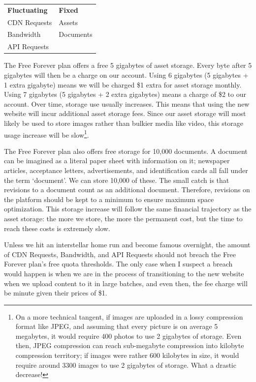 \begin{table}[H]
    \centering
    \setlength{\tabcolsep}{10pt} %
    \renewcommand{\arraystretch}{1.5} %
    \begin{tabular}{ l l }
        \textbf{Fluctuating} & \textbf{Fixed} \\
        CDN Requests & Assets \\
        Bandwidth & Documents \\
        API Requests & \\
    \end{tabular}
\end{table}

The Free Forever plan offers a free 5 gigabytes of asset storage. Every byte after 5 gigabytes will then be a charge on our account. Using 6 gigabytes (5 gigabytes + 1 extra gigabyte) means we will be charged \$1 extra for asset storage monthly. Using 7 gigabytes (5 gigabytes + 2 extra gigabytes) means a charge of \$2 to our account. Over time, storage use usually increases. This means that using the new website will incur additional asset storage fees. Since our asset storage will most likely be used to store images rather than bulkier media like video, this storage usage increase will be slow\footnote{On a more technical tangent, if images are uploaded in a lossy compression format like JPEG, and assuming that every picture is on average 5 megabytes, it would require 400 photos to use 2 gigabytes of storage. Even then, JPEG compression can reach sub-megabyte compression into kilobyte compression territory; if images were rather 600 kilobytes in size, it would require around 3300 images to use 2 gigabytes of storage. What a drastic decrease!}.

The Free Forever plan also offers free storage for 10,000 documents. A document can be imagined as a literal paper sheet with information on it; newspaper articles, acceptance letters, advertisements, and identification cards all fall under the term `document'. We can store 10,000 of these. The small catch is that revisions to a document count as an additional document. Therefore, revisions on the platform should be kept to a minimum to ensure maximum space optimization. This storage increase will follow the same financial trajectory as the asset storage: the more we store, the more the permanent cost, but the time to reach these costs is extremely slow.

Unless we hit an interstellar home run and become famous overnight, the amount of CDN Requests, Bandwidth, and API Requests should not breach the Free Forever plan's free quota thresholds. The only case when I suspect a breach would happen is when we are in the process of transitioning to the new website when we upload content to it in large batches, and even then, the fee charge will be minute given their prices of \$1.


